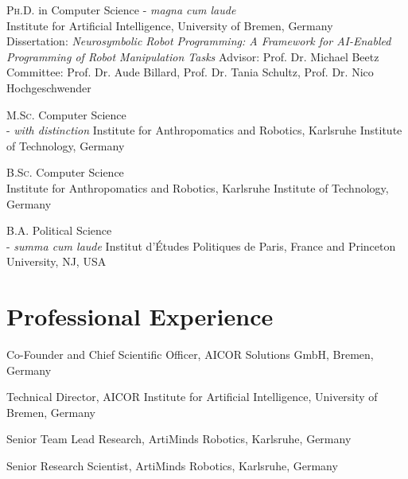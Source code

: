 \documentclass[11pt]{article} %
\begin{document}
\textsc{Ph.D.} in Computer Science - \textit{magna cum laude} \\
Institute for Artificial Intelligence, University of Bremen, Germany\\
Dissertation: \textit{Neurosymbolic Robot Programming: A Framework for AI-Enabled Programming of Robot Manipulation Tasks}
Advisor: Prof. Dr. Michael Beetz\\
Committee: Prof. Dr. Aude Billard, Prof. Dr. Tania Schultz, Prof. Dr. Nico Hochgeschwender 

\medskip

\textsc{M.Sc.} Computer Science\\ - \textit{with distinction}
Institute for Anthropomatics and Robotics, Karlsruhe Institute of Technology, Germany

\medskip

\textsc{B.Sc.} Computer Science\\
Institute for Anthropomatics and Robotics, Karlsruhe Institute of Technology, Germany

\medskip

\textsc{B.A.} Political Science\\ - \textit{summa cum laude} 
Institut d'Études Politiques de Paris, France and Princeton University, NJ, USA


\section*{Professional Experience}

Co-Founder and Chief Scientific Officer, AICOR Solutions GmbH, Bremen, Germany

\medskip

Technical Director, AICOR Institute for Artificial Intelligence, University of Bremen, Germany

\medskip

Senior Team Lead Research, ArtiMinds Robotics, Karlsruhe, Germany

\medskip

Senior Research Scientist, ArtiMinds Robotics, Karlsruhe, Germany

\medskip
\end{document}
